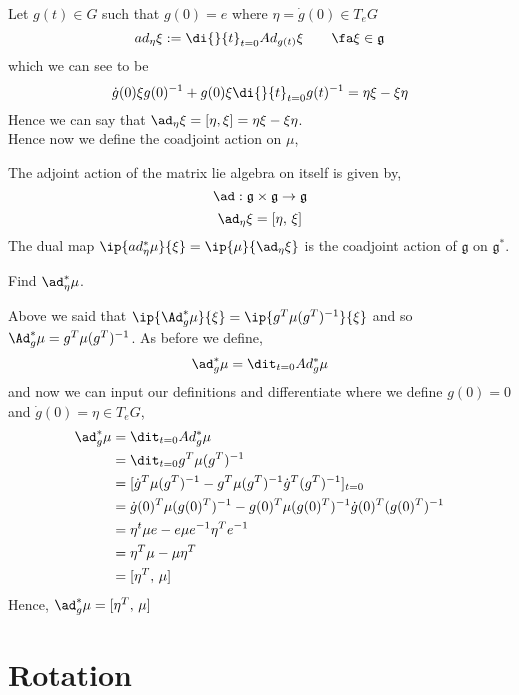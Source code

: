 
Let $g(t) \in G$ such that $g(0) = e$ where $\eta = \dot g (0) \in T_eG$
$$ ad_\eta \xi := \di {}{t} _{t = 0} Ad_{g(t)}\xi \qquad \fa \xi \in \mathfrak{g} $$
which we can see to be
$$ \dot g(0)\xi g(0)^{-1} + g(0)\xi \di {}{t}_{t=0} g(t)^{-1}= \eta\xi - \xi\eta $$
Hence we can say that $\ad_{\eta}\xi = [\eta, \xi] = \eta\xi - \xi\eta$.\\
Hence now we define the coadjoint action on $\mu$,
\begin{ndefi}
  The adjoint action of the matrix lie algebra on itself is given by,
  $$ \ad : \mathfrak{g}\times \mathfrak{g} \to \mathfrak{g} $$
  $$ \ad_\eta \xi = [\eta,\, \xi] $$
  The dual map $\ip{ad^*_\eta \mu}{\xi} = \ip{\mu}{\ad_\eta \xi}$ is the coadjoint action of $\mathfrak{g}$ on $\mathfrak{g}^*$.
\end{ndefi}

\begin{exercise}
  Find $\ad^*_\eta \mu$.
\end{exercise}
{\color{red} \begin{solution}
  Above we said that $\ip{\Ad^*_g\mu}{\xi} = \ip{g^T \mu (g^T)^{-1}}{\xi}$ and so $\Ad^*_g \mu = g^T \mu (g^T)^{-1}$. As before we define,
  $$ \ad^*_g \mu = \dit_{t=0} Ad_g^* \mu $$
  and now we can input our definitions and differentiate where we define $g(0) = 0$ and $\dot g (0) = \eta \in T_eG$,
  \begin{align*}
    \ad^*_g \mu &= \dit_{t=0} Ad_g^* \mu \\
    &= \dit_{t=0} g^T \mu (g^T)^{-1} \\
    &= [\dot g^T \mu (g^T)^{-1} - g^T \mu (g^T)^{-1}\dot g^T (g^T)^{-1}]_{t=0} \\
    &= \dot g(0)^T \mu (g(0)^T)^{-1} - g(0)^T \mu (g(0)^T)^{-1}\dot g(0)^T (g(0)^T)^{-1} \\
    &= \eta^t \mu e - e \mu e^{-1} \eta^T e^{-1} \\
    &= \eta^T \mu - \mu \eta^T \\
    &= [\eta^T,\,\mu]
  \end{align*}
  Hence, $\ad_g^*\mu = [\eta^T,\,\mu]$
\end{solution}
 }
\section{Rotation}
